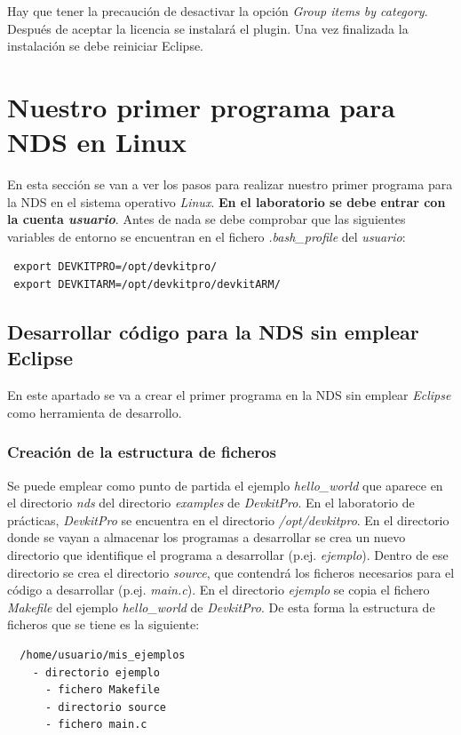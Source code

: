 Hay que tener la precaución de desactivar la opción \textit{Group items by category}. Después de aceptar la licencia se instalará el plugin. Una vez finalizada la instalación se debe reiniciar Eclipse.

\section{Nuestro primer programa para NDS en Linux}
En esta sección se van a ver los pasos para realizar nuestro primer programa para la NDS en el sistema operativo \textit{Linux}. \textbf{En el laboratorio se debe entrar con la cuenta \textit{usuario}}. Antes de nada se debe comprobar que las siguientes variables de entorno se encuentran en el fichero \textit{.bash\_profile} del \textit{usuario}:
\begin{verbatim}
 export DEVKITPRO=/opt/devkitpro/
 export DEVKITARM=/opt/devkitpro/devkitARM/
\end{verbatim}

\subsection{Desarrollar código para la NDS sin emplear Eclipse}
En este apartado se va a crear el primer programa en la NDS sin emplear \textit{Eclipse} como herramienta de desarrollo.

\subsubsection{Creación de la estructura de ficheros}
Se puede emplear como punto de partida el ejemplo  \textit{hello\_world} que aparece en el directorio \textit{nds} del directorio \textit{examples} de  \textit{DevkitPro}. En  el laboratorio de prácticas, \textit{DevkitPro} se encuentra en el directorio \textit{/opt/devkitpro}. En el directorio donde se vayan a almacenar los programas a desarro\-llar se crea un nuevo directorio que identifique el programa a desarrollar (p.ej. \textit{ejemplo}). Dentro de ese directorio se crea el directorio \textit{source}, que contendrá los ficheros necesarios para el código a desarrollar (p.ej. \textit{main.c}). En el directorio \textit{ejemplo} se copia el fichero \textit{Makefile} del  ejemplo  \textit{hello\_world} de \textit{DevkitPro}. De esta forma la estructura de ficheros que se tiene es la siguiente:
\begin{verbatim}
  /home/usuario/mis_ejemplos
    - directorio ejemplo
      - fichero Makefile
      - directorio source
      - fichero main.c
\end{verbatim}



